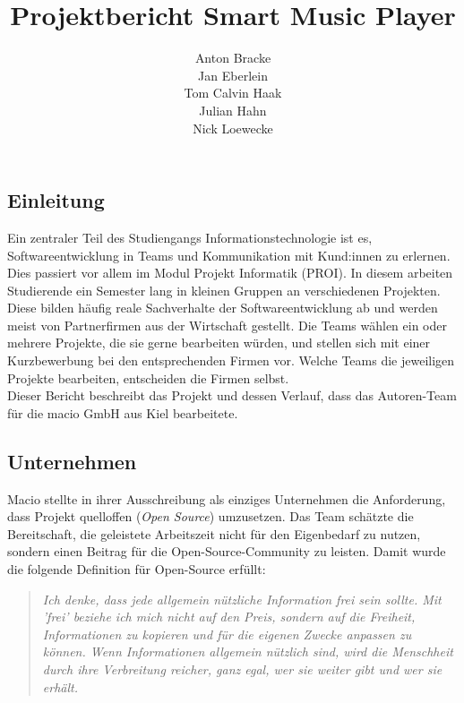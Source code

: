 \documentclass[10pt, a4paper]{article}
\title{Projektbericht Smart Music Player}
\author{Anton Bracke\\Jan Eberlein\\Tom Calvin Haak\\Julian Hahn\\Nick Loewecke}
\begin{document}
\begin{onehalfspace}
\maketitle
\newpage
\tableofcontents
\newpage




\section{Einleitung}
Ein zentraler Teil des Studiengangs \glqq Informationstechnologie\grqq{} ist es, Softwareentwicklung in Teams und Kommunikation mit Kund:innen zu erlernen. \cite{Qualifikationsziele_Informationstechnologie}
Dies passiert vor allem im Modul \glqq Projekt Informatik (PROI)\grqq{}.
In diesem arbeiten Studierende ein Semester lang in kleinen Gruppen an verschiedenen Projekten.
Diese bilden häufig reale Sachverhalte der Softwareentwicklung ab und werden meist von Partnerfirmen aus der Wirtschaft gestellt.
Die Teams wählen ein oder mehrere Projekte, die sie gerne bearbeiten würden, und stellen sich mit einer Kurzbewerbung bei den entsprechenden Firmen vor.
Welche Teams die jeweiligen Projekte bearbeiten, entscheiden die Firmen selbst.
\\
Dieser Bericht beschreibt das Projekt und dessen Verlauf, dass das Autoren-Team für die macio GmbH aus Kiel bearbeitete.

\subsection{Unternehmen}
Macio stellte in ihrer Ausschreibung als einziges Unternehmen die Anforderung, dass Projekt quelloffen (\textit{Open Source}) umzusetzen.
Das Team schätzte die Bereitschaft, die geleistete Arbeitszeit nicht für den Eigenbedarf zu nutzen, sondern einen Beitrag für die Open-Source-Community zu leisten.
Damit wurde die folgende Definition für Open-Source erfüllt:

\begin{quote}
  \textit{Ich denke, dass jede allgemein nützliche Information frei sein sollte.
  Mit 'frei' beziehe ich mich nicht auf den Preis, sondern auf die Freiheit, Informationen zu kopieren und für die eigenen Zwecke anpassen zu können.
  Wenn Informationen allgemein nützlich sind, wird die Menschheit durch ihre Verbreitung reicher, ganz egal, wer sie weiter gibt und wer sie erhält.}
  \cite{openSource}
\end{quote}


\end{onehalfspace}
\end{document}
